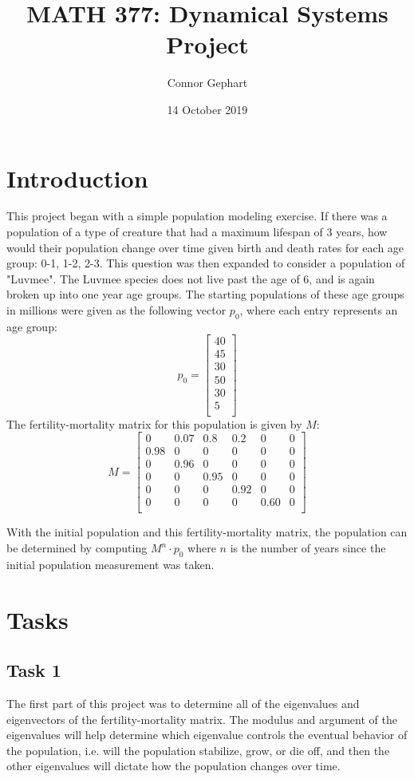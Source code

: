 \documentclass[12pt]{extarticle}
\title{MATH 377: Dynamical Systems Project}
\author{Connor Gephart}
\date{14 October 2019}
\begin{document}
\maketitle
\section{Introduction}
This project began with a simple population modeling exercise. If there was a population of a type of creature that had a maximum lifespan of 3 years, how would their population change over time given birth and death rates for each age group: 0-1, 1-2, 2-3. This question was then expanded to consider a population of "Luvmee". The Luvmee species does not live past the age of 6, and is again broken up into one year age groups. The starting populations of these age groups in millions were given as the following vector $p_0$, where each entry represents an age group:
\[p_0 = \begin{bmatrix}
40\\45\\30\\50\\30\\5\\
\end{bmatrix}\]
\newline
The fertility-mortality matrix for this population is given by $M$:
\[M = \begin{bmatrix}
0&0.07&0.8&0.2&0&0\\
0.98&0&0&0&0&0\\
0&0.96&0&0&0&0\\
0&0&0.95&0&0&0\\
0&0&0&0.92&0&0\\
0&0&0&0&0.60&0\\
\end{bmatrix}\]

With the initial population and this fertility-mortality matrix, the population can be determined by computing $M^n\cdot p_0$ where $n$ is the number of years since the initial population measurement was taken. 
\section{Tasks}
\subsection{Task 1}
The first part of this project was to determine all of the eigenvalues and eigenvectors of the fertility-mortality matrix. The modulus and argument of the eigenvalues will help determine which eigenvalue controls the eventual behavior of the population, i.e. will the population stabilize, grow, or die off, and then the other eigenvalues will dictate how the population changes over time. 
\end{document}
